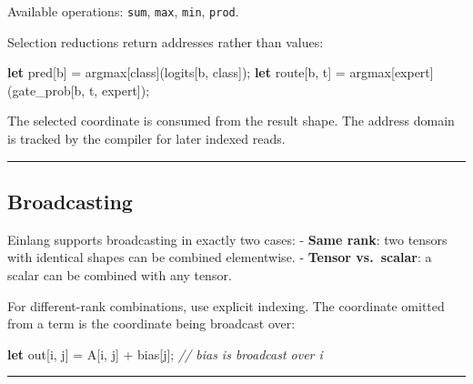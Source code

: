 \documentclass[11pt,]{article}
\newenvironment{Shaded}{}{}
\newcommand{\CommentTok}[1]{\textcolor[rgb]{0.38,0.63,0.69}{\textit{#1}}}
\newcommand{\KeywordTok}[1]{\textcolor[rgb]{0.00,0.44,0.13}{\textbf{#1}}}
\newcommand{\NormalTok}[1]{#1}
\newcommand{\OperatorTok}[1]{\textcolor[rgb]{0.40,0.40,0.40}{#1}}
\begin{document}
Available operations: \texttt{sum}, \texttt{max}, \texttt{min},
\texttt{prod}.

Selection reductions return addresses rather than values:

\begin{Shaded}
\begin{Highlighting}[]
\KeywordTok{let}\NormalTok{ pred}\OperatorTok{[}\NormalTok{b}\OperatorTok{]}\NormalTok{ = argmax}\OperatorTok{[}\NormalTok{class}\OperatorTok{]}\NormalTok{(logits}\OperatorTok{[}\NormalTok{b, class}\OperatorTok{]}\NormalTok{);}
\KeywordTok{let}\NormalTok{ route}\OperatorTok{[}\NormalTok{b, t}\OperatorTok{]}\NormalTok{ = argmax}\OperatorTok{[}\NormalTok{expert}\OperatorTok{]}\NormalTok{(gate_prob}\OperatorTok{[}\NormalTok{b, t, expert}\OperatorTok{]}\NormalTok{);}
\end{Highlighting}
\end{Shaded}

The selected coordinate is consumed from the result shape. The address
domain is tracked by the compiler for later indexed reads.

\begin{center}\rule{0.5\linewidth}{0.4pt}\end{center}

\hypertarget{broadcasting}{%
\subsection{Broadcasting}\label{broadcasting}}

Einlang supports broadcasting in exactly two cases: - \textbf{Same
rank}: two tensors with identical shapes can be combined elementwise. -
\textbf{Tensor vs.~scalar}: a scalar can be combined with any tensor.

For different-rank combinations, use explicit indexing. The coordinate
omitted from a term is the coordinate being broadcast over:

\begin{Shaded}
\begin{Highlighting}[]
\KeywordTok{let}\NormalTok{ out}\OperatorTok{[}\NormalTok{i, j}\OperatorTok{]}\NormalTok{ = A}\OperatorTok{[}\NormalTok{i, j}\OperatorTok{]}\NormalTok{ + bias}\OperatorTok{[}\NormalTok{j}\OperatorTok{]}\NormalTok{;   }\CommentTok{// bias is broadcast over i}
\end{Highlighting}
\end{Shaded}

\begin{center}\rule{0.5\linewidth}{0.4pt}\end{center}
\end{document}
